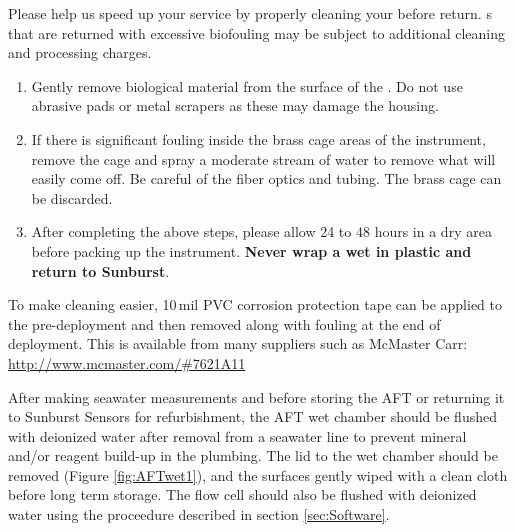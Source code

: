     \begin{minipage}[t]{0.5\textwidth}
    Please help us speed up your service by properly cleaning your \instType{} before return.  \instType{}s that are returned with excessive biofouling may be subject to additional cleaning and processing charges.\\
    
    \begin{enumerate}
    \item Gently remove biological material from the surface of the \instType{}.  Do not use abrasive pads or metal scrapers as these may damage the housing.\\
    
    \item If there is significant fouling inside the brass cage areas of the instrument, remove the cage and spray a moderate stream of water to remove what will easily come off.  Be careful of the fiber optics and tubing.  The brass cage can be discarded.\\
    
    \item After completing the above steps, please allow 24 to 48 hours in a dry area before packing up the instrument. \textbf{Never wrap a wet \instType{} in plastic and return to Sunburst}.
\end{enumerate}

    \vspace*{4cm}
    \noindent
    To make cleaning easier, 10\,mil PVC corrosion protection tape can be applied to the \instType{} pre-deployment and then removed along with fouling at the end of deployment. This is available from many suppliers such as McMaster Carr:
    \newline
    \url{http://www.mcmaster.com/#7621A11}
    \end{minipage}

\or	%
    After making seawater measurements and before storing the AFT or returning it to Sunburst Sensors for refurbishment, the AFT wet chamber should be flushed with deionized water after removal from a seawater line to prevent mineral and/or reagent build-up in the plumbing. The lid to the wet chamber should be removed (Figure \ref{fig:AFTwet1}), and the surfaces gently wiped with a clean cloth before long term storage.  The flow cell should also be flushed with deionized water using the proceedure described in section \ref{sec:Software}.
    
